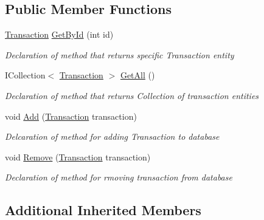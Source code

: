 \subsection*{Public Member Functions}
\begin{DoxyCompactItemize}
\item 
\mbox{\hyperlink{class_gielda_l2_1_1_d_b_1_1_entities_1_1_transaction}{Transaction}} \mbox{\hyperlink{interface_gielda_l2_1_1_d_b_1_1_interfaces_1_1_i_transaction_repository_a40ecc5e312af4137c8fe31276d8dda45}{Get\+By\+Id}} (int id)
\begin{DoxyCompactList}\small\item\em Declaration of method that returns specific Transaction entity \end{DoxyCompactList}\item 
I\+Collection$<$ \mbox{\hyperlink{class_gielda_l2_1_1_d_b_1_1_entities_1_1_transaction}{Transaction}} $>$ \mbox{\hyperlink{interface_gielda_l2_1_1_d_b_1_1_interfaces_1_1_i_transaction_repository_a75aa347958df45ffbb7133fce8ba496f}{Get\+All}} ()
\begin{DoxyCompactList}\small\item\em Declaration of method that returns Collection of transaction entities \end{DoxyCompactList}\item 
void \mbox{\hyperlink{interface_gielda_l2_1_1_d_b_1_1_interfaces_1_1_i_transaction_repository_a3f4295d1d4898ed86d72734cc970cd90}{Add}} (\mbox{\hyperlink{class_gielda_l2_1_1_d_b_1_1_entities_1_1_transaction}{Transaction}} transaction)
\begin{DoxyCompactList}\small\item\em Delcaration of method for adding Transaction to database \end{DoxyCompactList}\item 
void \mbox{\hyperlink{interface_gielda_l2_1_1_d_b_1_1_interfaces_1_1_i_transaction_repository_a6bd6442beda16c8af22a14457f1c6cc5}{Remove}} (\mbox{\hyperlink{class_gielda_l2_1_1_d_b_1_1_entities_1_1_transaction}{Transaction}} transaction)
\begin{DoxyCompactList}\small\item\em Declaration of method for rmoving transaction from database \end{DoxyCompactList}\end{DoxyCompactItemize}
\subsection*{Additional Inherited Members}


